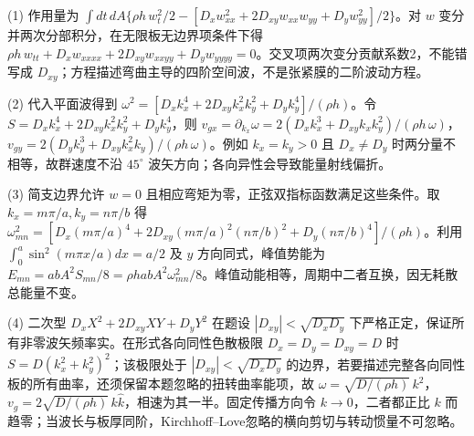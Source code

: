 (1) 作用量为 \(\int dt\,dA\{\rho h\,w_t^2/2-[D_xw_{xx}^2+2D_{xy}w_{xx}w_{yy}+D_yw_{yy}^2]/2\}\)。对 \(w\) 变分并两次分部积分，在无限板无边界项条件下得 \(\boxed{\rho h\,w_{tt}+D_xw_{xxxx}+2D_{xy}w_{xxyy}+D_yw_{yyyy}=0}\)。交叉项两次变分贡献系数2，不能错写成 \(D_{xy}\)；方程描述弯曲主导的四阶空间波，不是张紧膜的二阶波动方程。

(2) 代入平面波得到 \(\boxed{\omega^2=[D_xk_x^4+2D_{xy}k_x^2k_y^2+D_yk_y^4]/(\rho h)}\)。令 \(S=D_xk_x^4+2D_{xy}k_x^2k_y^2+D_yk_y^4\)，则 \(v_{gx}=\partial_{k_x}\omega=2(D_xk_x^3+D_{xy}k_xk_y^2)/(\rho h\,\omega)\)，\(v_{gy}=2(D_yk_y^3+D_{xy}k_x^2k_y)/(\rho h\,\omega)\)。例如 \(k_x=k_y>0\) 且 \(D_x\ne D_y\) 时两分量不相等，故群速度不沿 \(45^\circ\) 波矢方向；各向异性会导致能量射线偏折。

(3) 简支边界允许 \(w=0\) 且相应弯矩为零，正弦双指标函数满足这些条件。取 \(k_x=m\pi/a,k_y=n\pi/b\) 得 \(\boxed{\omega_{mn}^2=[D_x(m\pi/a)^4+2D_{xy}(m\pi/a)^2(n\pi/b)^2+D_y(n\pi/b)^4]/(\rho h)}\)。利用 \(\int_0^a\sin^2(m\pi x/a)dx=a/2\) 及 \(y\) 方向同式，峰值势能为 \(E_{mn}=abA^2S_{mn}/8=\rho habA^2\omega_{mn}^2/8\)。峰值动能相等，周期中二者互换，因无耗散总能量不变。

(4) 二次型 \(D_xX^2+2D_{xy}XY+D_yY^2\) 在题设 \(|D_{xy}|<\sqrt{D_xD_y}\) 下严格正定，保证所有非零波矢频率实。在形式各向同性色散极限 \(D_x=D_y=D_{xy}=D\) 时 \(S=D(k_x^2+k_y^2)^2\)；该极限处于 \(|D_{xy}|<\sqrt{D_xD_y}\) 的边界，若要描述完整各向同性板的所有曲率，还须保留本题忽略的扭转曲率能项，故 \(\omega=\sqrt{D/(\rho h)}\,k^2\)，\(v_g=2\sqrt{D/(\rho h)}\,k\hat k\)，相速为其一半。固定传播方向令 \(k\to0\)，二者都正比 \(k\) 而趋零；当波长与板厚同阶，Kirchhoff–Love忽略的横向剪切与转动惯量不可忽略。
